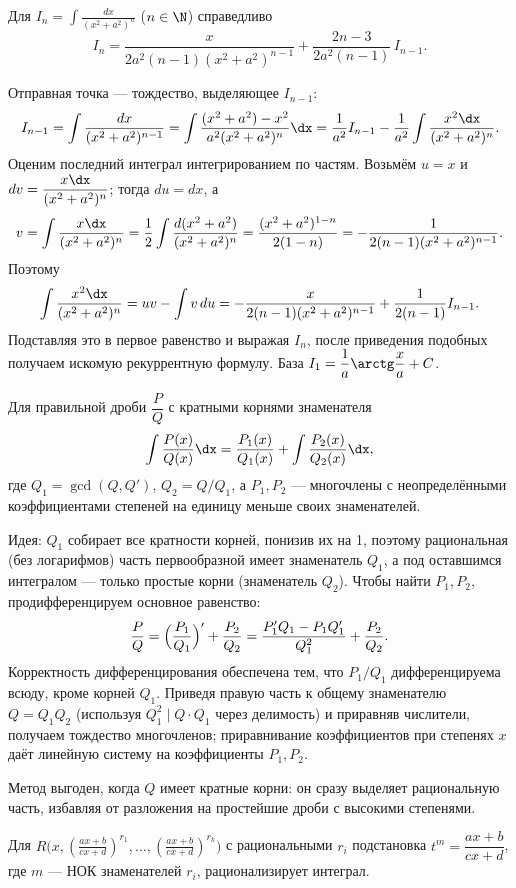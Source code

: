 \stmt Для $I_n=\displaystyle\int\frac{dx}{(x^2+a^2)^n}$ ($n\in\N$) справедливо
\[
  I_n=\frac{x}{2a^2(n-1)(x^2+a^2)^{n-1}}+\frac{2n-3}{2a^2(n-1)}\,I_{n-1}.
\]

\dok Отправная точка — тождество, выделяющее $I_{n-1}$:
\[
  I_{n-1}=\int\frac{dx}{(x^2+a^2)^{n-1}}
  =\int\frac{(x^2+a^2)-x^2}{a^2(x^2+a^2)^{n}}\dx
  =\frac{1}{a^2}I_{n-1}-\frac1{a^2}\int\frac{x^2\dx}{(x^2+a^2)^n}.
\]
Оценим последний интеграл интегрированием по частям. Возьмём $u=x$ и
$dv=\dfrac{x\dx}{(x^2+a^2)^n}$; тогда $du=dx$, а
\[
  v=\int\frac{x\dx}{(x^2+a^2)^n}=\frac{1}{2}\int\frac{d(x^2+a^2)}{(x^2+a^2)^n}
   =\frac{(x^2+a^2)^{1-n}}{2(1-n)}=-\frac1{2(n-1)(x^2+a^2)^{n-1}}.
\]
Поэтому
\[
  \int\frac{x^2\dx}{(x^2+a^2)^n}=uv-\int v\,du
  =-\frac{x}{2(n-1)(x^2+a^2)^{n-1}}+\frac1{2(n-1)}I_{n-1}.
\]
Подставляя это в первое равенство и выражая $I_n$, после приведения подобных получаем искомую
рекуррентную формулу. База $I_1=\dfrac1a\arctg\dfrac xa+C$.

\stmt Для правильной дроби $\dfrac{P}{Q}$ с кратными корнями знаменателя
\[
  \int\frac{P(x)}{Q(x)}\dx=\frac{P_1(x)}{Q_1(x)}+\int\frac{P_2(x)}{Q_2(x)}\dx,
\]
где $Q_1=\gcd(Q,Q')$, $Q_2=Q/Q_1$, а $P_1,P_2$ — многочлены с неопределёнными коэффициентами
степеней на единицу меньше своих знаменателей.

\dok Идея: $Q_1$ собирает все кратности корней, понизив их на 1, поэтому рациональная (без
логарифмов) часть первообразной имеет знаменатель $Q_1$, а под оставшимся интегралом — только
простые корни (знаменатель $Q_2$). Чтобы найти $P_1,P_2$, продифференцируем основное равенство:
\[
  \frac{P}{Q}=\Bigl(\frac{P_1}{Q_1}\Bigr)'+\frac{P_2}{Q_2}
  =\frac{P_1'Q_1-P_1Q_1'}{Q_1^2}+\frac{P_2}{Q_2}.
\]
Корректность дифференцирования обеспечена тем, что $P_1/Q_1$ дифференцируема всюду, кроме корней
$Q_1$. Приведя правую часть к общему знаменателю $Q=Q_1Q_2$ (используя $Q_1^2\mid Q\cdot Q_1$ через
делимость) и приравняв числители, получаем тождество многочленов; приравнивание коэффициентов при
степенях $x$ даёт линейную систему на коэффициенты $P_1,P_2$.

Метод выгоден, когда $Q$ имеет кратные корни: он сразу выделяет рациональную часть, избавляя от
разложения на простейшие дроби с высокими степенями.

\stmt Для $R\bigl(x,(\tfrac{ax+b}{cx+d})^{r_1},\dots,(\tfrac{ax+b}{cx+d})^{r_k}\bigr)$ с
рациональными $r_i$ подстановка $t^m=\dfrac{ax+b}{cx+d}$, где $m$ — НОК знаменателей $r_i$,
рационализирует интеграл.

